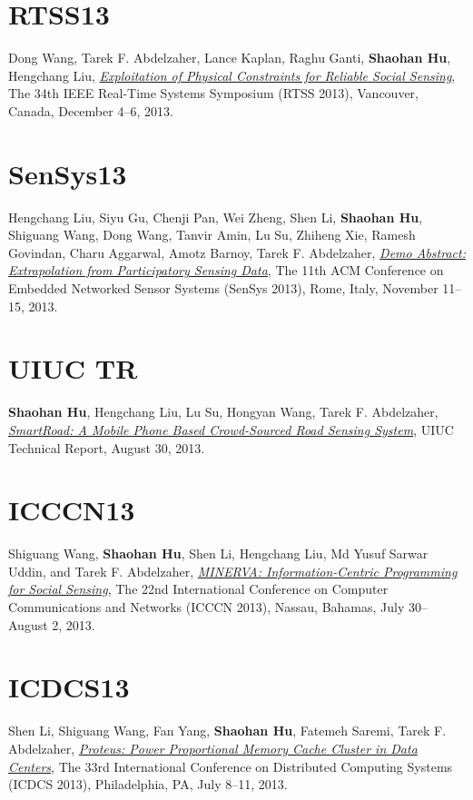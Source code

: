 \section{\sc RTSS13}\hypertarget{wang2013rtss}{}
Dong Wang, Tarek F. Abdelzaher, Lance Kaplan, Raghu Ganti,
\textbf{Shaohan Hu}, Hengchang Liu, \href{http://ieeexplore.ieee.org/xpl/articleDetails.jsp?tp=&arnumber=6728876}{\emph{Exploitation of Physical
  Constraints for Reliable Social Sensing}}, \textsf{The 34th IEEE
  Real-Time Systems Symposium (RTSS 2013)}, Vancouver, Canada,
December 4--6, 2013.

\section{\sc SenSys13}\hypertarget{liu2013sensys}{}
Hengchang Liu, Siyu Gu, Chenji Pan, Wei Zheng, Shen Li,
\textbf{Shaohan Hu}, Shiguang Wang, Dong Wang, Tanvir Amin, Lu Su,
Zhiheng Xie, Ramesh Govindan, Charu Aggarwal, Amotz Barnoy, Tarek F.
Abdelzaher, \href{http://portal.acm.org/citation.cfm?id=2517431}{\emph{Demo Abstract: Extrapolation from Participatory
  Sensing Data}}, \textsf{The 11th ACM Conference on Embedded Networked
  Sensor Systems (SenSys 2013)}, Rome, Italy, November 11--15, 2013.

\section{\sc UIUC TR}\hypertarget{hu2013uiuc2}{}
\textbf{Shaohan Hu}, Hengchang Liu, Lu Su, Hongyan Wang, Tarek F.
Abdelzaher, \href{https://www.ideals.illinois.edu/handle/2142/45699}{\emph{SmartRoad: A Mobile Phone Based Crowd-Sourced Road
  Sensing System}}, \textsf{UIUC Technical Report}, August 30, 2013.

\section{\sc ICCCN13}\hypertarget{wang2013icccn}{}
Shiguang Wang, \textbf{Shaohan Hu}, Shen Li, Hengchang Liu, Md Yusuf
Sarwar Uddin, and Tarek F. Abdelzaher, \href{http://ieeexplore.ieee.org/xpls/abs_all.jsp?arnumber=6614152}{\emph{MINERVA: Information-Centric
  Programming for Social Sensing}}, \textsf{The 22nd International
  Conference on Computer Communications and Networks (ICCCN 2013)},
Nassau, Bahamas, July 30--August 2, 2013.

\section{\sc ICDCS13}\hypertarget{li2013icdcs}{}
Shen Li, Shiguang Wang, Fan Yang, \textbf{Shaohan Hu}, Fatemeh Saremi,
Tarek F. Abdelzaher, \href{http://ieeexplore.ieee.org/xpl/articleDetails.jsp?arnumber=6681577}{\emph{Proteus: Power Proportional Memory Cache
  Cluster in Data Centers}}, \textsf{The 33rd International Conference
  on Distributed Computing Systems (ICDCS 2013)}, Philadelphia, PA,
July 8--11, 2013.

